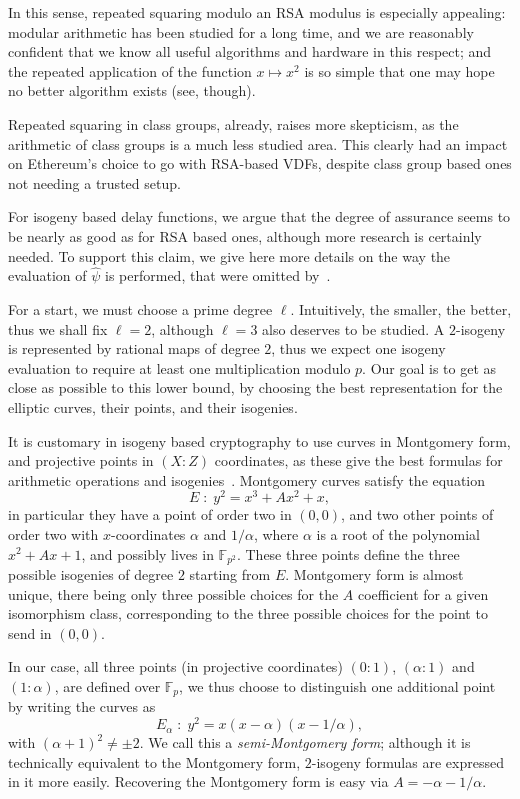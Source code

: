 \documentclass{llncs}
\newcommand{\F}{\mathbb{F}}
\begin{document}
In this sense, repeated squaring modulo an RSA modulus is especially
appealing: modular arithmetic has been studied for a long time, and we
are reasonably confident that we know all useful algorithms and
hardware in this respect; and the repeated application of the function
$x\mapsto x^2$ is so simple that one may hope no better algorithm
exists (see\cite{BernsteinSorenson07}, though).

Repeated squaring in class groups, already, raises more skepticism, as
the arithmetic of class groups is a much less studied area. %
This clearly had an impact on Ethereum's choice to go with RSA-based
VDFs, despite class group based ones not needing a trusted setup.

For isogeny based delay functions, we argue that the degree of
assurance seems to be nearly as good as for RSA based ones, although
more research is certainly needed. %
To support this claim, we give here more details on the way the
evaluation of $\hat\psi$ is performed, that were omitted
by~\cite{10.1007/978-3-030-34578-5_10}.

For a start, we must choose a prime degree $\ell$. %
Intuitively, the smaller, the better, thus we shall fix $\ell=2$,
although $\ell=3$ also deserves to be studied. %
A $2$-isogeny is represented by rational maps of degree $2$, thus we
expect one isogeny evaluation to require at least one multiplication
modulo $p$. %
Our goal is to get as close as possible to this lower bound, by
choosing the best representation for the elliptic curves, their
points, and their isogenies.

It is customary in isogeny based cryptography to use curves in
Montgomery form, and projective points in $(X:Z)$ coordinates, as
these give the best formulas for arithmetic operations and
isogenies~\cite{costello2016sidh,10.1007/978-3-319-79063-3_11}. %
Montgomery curves satisfy the equation
\[E \;:\; y^2 = x^3 + Ax^2 + x,\] %
in particular they have a point of order two in $(0,0)$, and two other
points of order two with $x$-coordinates $\alpha$ and $1/\alpha$,
where $\alpha$ is a root of the polynomial $x^2+Ax+1$, and possibly
lives in $\F_{p^2}$. %
These three points define the three possible isogenies of degree $2$
starting from $E$. %
Montgomery form is almost unique, there being only three possible
choices for the $A$ coefficient for a given isomorphism class,
corresponding to the three possible choices for the point to send in
$(0,0)$.

In our case, all three points (in projective coordinates) $(0:1)$,
$(\alpha:1)$ and $(1:\alpha)$, are defined over $\F_p$, we thus choose
to distinguish one additional point by writing the curves as
\[E_\alpha \;:\; y^2 = x(x-\alpha)(x - 1/\alpha),\] %
with $(\alpha+1)^2\ne\pm 2$. %
We call this a \emph{semi-Montgomery form}; although it is technically
equivalent to the Montgomery form, $2$-isogeny formulas are expressed
in it more easily. %
Recovering the Montgomery form is easy via $A=-\alpha-1/\alpha$.
\end{document}
